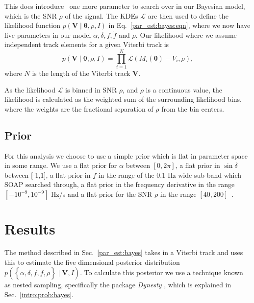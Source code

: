 This does introduce~ one more parameter to search over in our
Bayesian model, which is the \gls{SNR} $\rho$ of the signal.  The \glspl{KDE}
$\mathcal{L}$ are then used to define the likelihood function $p(\bm{V} \mid
\bm{\theta}, \rho, I)$ in Eq.~\ref{par_est:bayes:eqn}, where we now have five parameters in our model
$\alpha, \delta, f, \dot{f}$ and $\rho$.  Our likelihood where we assume
independent track elements for a given Viterbi track is
%
\begin{equation} 
p(\bm{V} \mid \bm{\theta}, \rho, I) = \prod_{i =
1}^{N} \mathcal{L}(M_i(\bm{\theta}) - V_i, \rho) , 
\end{equation} 
%
where $N$ is the length of the Viterbi track $\bm{V}$.  

\if
As the likelihood $\mathcal{L}$ is binned in \gls{SNR} $\rho$, and $\rho$ is a
continuous value, the likelihood is calculated as the weighted sum of the
surrounding likelihood bins, where the weights are the fractional separation of
$\rho$ from the bin centers.  
\fi

%
\subsection{Prior}
%
For this analysis we choose to use a simple prior which is flat in parameter space in some range.  We use a flat prior for $\alpha$
between $[0,2\pi]$, a flat prior in $\sin{\delta}$ between [-1,1], a flat prior
in $f$ in the range of the 0.1 Hz wide sub-band which SOAP searched through, a
flat prior in the frequency derivative in the range
$[-10^{-9},10^{-9}]$ Hz/s and a flat prior for the \gls{SNR} $\rho$ in
the range $[40,200]$~.


\clearpage

\section{\label{par_est:results}Results}

The method described in Sec.~\ref{par_est:bayes} takes in a Viterbi track and
uses this to estimate the five dimensional posterior distribution
$p\left(\left\{ \alpha, \delta, f, \dot{f}, \rho \right\} \mid \bm{V}, I
\right)$.  To calculate this posterior we use a technique known as nested
sampling, specifically the package {\it Dynesty}
\citep{speagle2019DynestyDynamic}, which is explained in
Sec.~\ref{intro:prob:bayes}.

